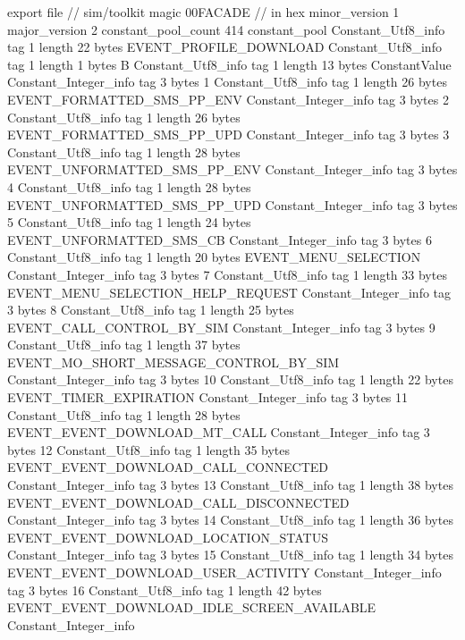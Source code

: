 export file {		// sim/toolkit
	magic	00FACADE		 // in hex
	minor_version	1
	major_version	2
	constant_pool_count	414
	constant_pool {
		Constant_Utf8_info {
			tag	1
			length	22
			bytes	EVENT_PROFILE_DOWNLOAD
		}
		Constant_Utf8_info {
			tag	1
			length	1
			bytes	B
		}
		Constant_Utf8_info {
			tag	1
			length	13
			bytes	ConstantValue
		}
		Constant_Integer_info {
			tag	3
			bytes	1
		}
		Constant_Utf8_info {
			tag	1
			length	26
			bytes	EVENT_FORMATTED_SMS_PP_ENV
		}
		Constant_Integer_info {
			tag	3
			bytes	2
		}
		Constant_Utf8_info {
			tag	1
			length	26
			bytes	EVENT_FORMATTED_SMS_PP_UPD
		}
		Constant_Integer_info {
			tag	3
			bytes	3
		}
		Constant_Utf8_info {
			tag	1
			length	28
			bytes	EVENT_UNFORMATTED_SMS_PP_ENV
		}
		Constant_Integer_info {
			tag	3
			bytes	4
		}
		Constant_Utf8_info {
			tag	1
			length	28
			bytes	EVENT_UNFORMATTED_SMS_PP_UPD
		}
		Constant_Integer_info {
			tag	3
			bytes	5
		}
		Constant_Utf8_info {
			tag	1
			length	24
			bytes	EVENT_UNFORMATTED_SMS_CB
		}
		Constant_Integer_info {
			tag	3
			bytes	6
		}
		Constant_Utf8_info {
			tag	1
			length	20
			bytes	EVENT_MENU_SELECTION
		}
		Constant_Integer_info {
			tag	3
			bytes	7
		}
		Constant_Utf8_info {
			tag	1
			length	33
			bytes	EVENT_MENU_SELECTION_HELP_REQUEST
		}
		Constant_Integer_info {
			tag	3
			bytes	8
		}
		Constant_Utf8_info {
			tag	1
			length	25
			bytes	EVENT_CALL_CONTROL_BY_SIM
		}
		Constant_Integer_info {
			tag	3
			bytes	9
		}
		Constant_Utf8_info {
			tag	1
			length	37
			bytes	EVENT_MO_SHORT_MESSAGE_CONTROL_BY_SIM
		}
		Constant_Integer_info {
			tag	3
			bytes	10
		}
		Constant_Utf8_info {
			tag	1
			length	22
			bytes	EVENT_TIMER_EXPIRATION
		}
		Constant_Integer_info {
			tag	3
			bytes	11
		}
		Constant_Utf8_info {
			tag	1
			length	28
			bytes	EVENT_EVENT_DOWNLOAD_MT_CALL
		}
		Constant_Integer_info {
			tag	3
			bytes	12
		}
		Constant_Utf8_info {
			tag	1
			length	35
			bytes	EVENT_EVENT_DOWNLOAD_CALL_CONNECTED
		}
		Constant_Integer_info {
			tag	3
			bytes	13
		}
		Constant_Utf8_info {
			tag	1
			length	38
			bytes	EVENT_EVENT_DOWNLOAD_CALL_DISCONNECTED
		}
		Constant_Integer_info {
			tag	3
			bytes	14
		}
		Constant_Utf8_info {
			tag	1
			length	36
			bytes	EVENT_EVENT_DOWNLOAD_LOCATION_STATUS
		}
		Constant_Integer_info {
			tag	3
			bytes	15
		}
		Constant_Utf8_info {
			tag	1
			length	34
			bytes	EVENT_EVENT_DOWNLOAD_USER_ACTIVITY
		}
		Constant_Integer_info {
			tag	3
			bytes	16
		}
		Constant_Utf8_info {
			tag	1
			length	42
			bytes	EVENT_EVENT_DOWNLOAD_IDLE_SCREEN_AVAILABLE
		}
		Constant_Integer_info {
}}}
